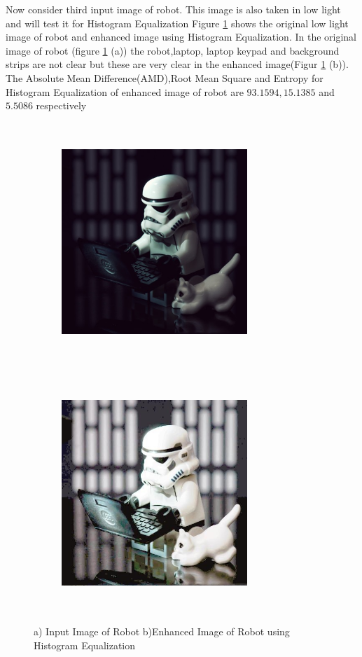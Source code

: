Now consider third input image of robot. This image is also taken in low light and will test it for Histogram Equalization Figure \ref{fig:robotHistEq} shows the original low light image of robot and enhanced image using  Histogram Equalization. In the original image of robot (figure \ref{fig:robotHistEq} (a))  the robot,laptop, laptop keypad and background strips are not clear but these are very clear in the enhanced image(Figur \ref{fig:robotHistEq} (b)). The Absolute Mean Difference(AMD),Root Mean Square and Entropy for  Histogram Equalization of enhanced image of robot are $93.1594, 15.1385$ and $5.5086$ respectively      



\begin{figure}
	\begin{subfigure}{8cm}
		\centering    
    	\includegraphics[width=7cm,height=9cm,keepaspectratio]{images/ch5/robot_input.jpg}
    	\caption{} 
    \end{subfigure}
  	\begin{subfigure}{6cm}
  		\centering
  		\includegraphics[width=7cm,height=9cm,keepaspectratio]{images/ch5/robot_hist_equ.jpg}
   		\caption{}
  	\end{subfigure}
  	\caption{a) Input Image of Robot b)Enhanced Image of Robot using Histogram Equalization}
  	\label{fig:robotHistEq}
\end{figure}



